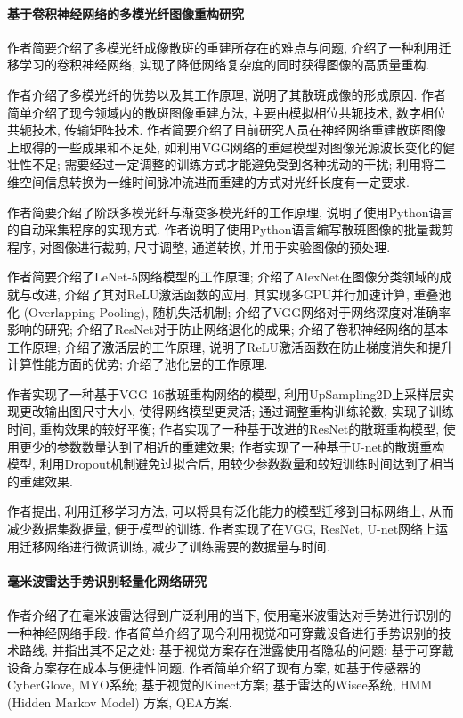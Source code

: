 \documentclass[]{ctexart}
\begin{document}
\paragraph{基于卷积神经网络的多模光纤图像重构研究\cite{fiber}} 作者简要介绍了多模光纤成像散斑的重建所存在的难点与问题, 介绍了一种利用迁移学习的卷积神经网络, 实现了降低网络复杂度的同时获得图像的高质量重构. 

	作者介绍了多模光纤的优势以及其工作原理, 说明了其散斑成像的形成原因. 作者简单介绍了现今领域内的散斑图像重建方法, 主要由模拟相位共轭技术, 数字相位共轭技术, 传输矩阵技术. 作者简要介绍了目前研究人员在神经网络重建散斑图像上取得的一些成果和不足处, 如利用VGG网络的重建模型对图像光源波长变化的健壮性不足; 需要经过一定调整的训练方式才能避免受到各种扰动的干扰; 利用将二维空间信息转换为一维时间脉冲流进而重建的方式对光纤长度有一定要求. 
	
	作者简要介绍了阶跃多模光纤与渐变多模光纤的工作原理, 说明了使用Python语言的自动采集程序的实现方式. 作者说明了使用Python语言编写散斑图像的批量裁剪程序, 对图像进行裁剪, 尺寸调整, 通道转换, 并用于实验图像的预处理. 
	
	作者简要介绍了LeNet-5网络模型的工作原理; 介绍了AlexNet在图像分类领域的成就与改进, 介绍了其对ReLU激活函数的应用, 其实现多GPU并行加速计算, 重叠池化 (Overlapping Pooling), 随机失活机制; 介绍了VGG网络对于网络深度对准确率影响的研究; 介绍了ResNet对于防止网络退化的成果; 介绍了卷积神经网络的基本工作原理; 介绍了激活层的工作原理, 说明了ReLU激活函数在防止梯度消失和提升计算性能方面的优势; 介绍了池化层的工作原理. 
	
	作者实现了一种基于VGG-16散斑重构网络的模型, 利用UpSampling2D上采样层实现更改输出图尺寸大小, 使得网络模型更灵活; 通过调整重构训练轮数, 实现了训练时间, 重构效果的较好平衡; 作者实现了一种基于改进的ResNet的散斑重构模型, 使用更少的参数数量达到了相近的重建效果; 作者实现了一种基于U-net的散斑重构模型, 利用Dropout机制避免过拟合后, 用较少参数数量和较短训练时间达到了相当的重建效果. 
	
	作者提出, 利用迁移学习方法, 可以将具有泛化能力的模型迁移到目标网络上, 从而减少数据集数据量, 便于模型的训练. 作者实现了在VGG, ResNet, U-net网络上运用迁移网络进行微调训练, 减少了训练需要的数据量与时间. 
	
\paragraph{毫米波雷达手势识别轻量化网络研究\cite{radar}} 作者介绍了在毫米波雷达得到广泛利用的当下, 使用毫米波雷达对手势进行识别的一种神经网络手段. 作者简单介绍了现今利用视觉和可穿戴设备进行手势识别的技术路线, 并指出其不足之处: 基于视觉方案存在泄露使用者隐私的问题; 基于可穿戴设备方案存在成本与便捷性问题. 作者简单介绍了现有方案, 如基于传感器的CyberGlove, MYO系统; 基于视觉的Kinect方案; 基于雷达的Wisee系统, HMM (Hidden Markov Model) 方案, QEA方案. 
\end{document}
